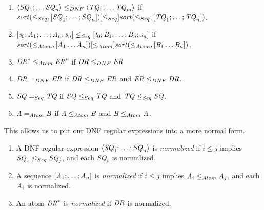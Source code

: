 \begin{definition}
  \begin{enumerate}
  \item
    $\langle\mathit{SQ}_1;\ldots\mathit{SQ}_n\rangle
    \leq_{DNF}
    \langle\mathit{TQ}_1;\ldots\mathit{TQ}_m\rangle$
    if
    $\mathit{sort}(\leq_{Seq},[ \mathit{SQ}_1;\ldots;\mathit{SQ}_n ])
    [ \leq_{Seq} ]
    \mathit{sort}(\leq_{Seq},[\mathit{TQ}_1;\ldots;\mathit{TQ}_n])$.
    
  \item
    $[\mathit{s}_0;\mathit{A}_1;\ldots;\mathit{A}_n;\mathit{s}_n]
    \leq_{Seq}
    [\mathit{t}_0;\mathit{B}_1;\ldots;\mathit{B}_n;\mathit{s}_n]$
    if
    $\mathit{sort}(\leq_{Atom},[ \mathit{A}_1\ldots\mathit{A}_n ])
    [ \leq_{Atom} ]
    \mathit{sort}(\leq_{Atom},[\mathit{B}_1\ldots\mathit{B}_n])$.

  \item
    ${\mathit{DR}}^* \leq_{Atom} {\mathit{ER}}^*$
    if
    $\mathit{DR} \leq_{DNF} \mathit{ER}$

  \item 
    $\mathit{DR} =_{DNF} \mathit{ER}$
    if
    $\mathit{DR} \leq_{DNF} \mathit{ER}$ and $\mathit{ER} \leq_{DNF} \mathit{DR}$.

  \item
    $\mathit{SQ} =_{Seq} \mathit{TQ}$
    if
    $\mathit{SQ} \leq_{Seq} \mathit{TQ}$ and $\mathit{TQ} \leq_{Seq}
    \mathit{SQ}$.

  \item
    $\mathit{A} =_{Atom} \mathit{B}$
    if
    $\mathit{A} \leq_{Atom} \mathit{B}$ and $\mathit{B} \leq_{Atom} \mathit{A}$.
  \end{enumerate}
\end{definition}

This allows us to put our DNF regular expressions into a more normal form.

\begin{definition}
  \begin{enumerate}
  \item A DNF regular expression $\langle\mathit{SQ}_1;\ldots;\mathit{SQ}_n\rangle$ is
    \textit{normalized} if $i \leq j$ implies $\mathit{SQ}_1\leq_{Seq}\mathit{SQ}_j$,
    and each $\mathit{SQ}_i$ is normalized.
  \item A sequence $[\mathit{A}_1;\ldots;\mathit{A}_n]$ is \textit{normalized}
    if $i \leq j$ implies $\mathit{A}_i\leq_{Atom}\mathit{A}_j$,
    and each $\mathit{A}_i$ is normalized.
  \item An atom ${\mathit{DR}}^*$ is \textit{normalized} if
    $\mathit{DR}$ is normalized.
  \end{enumerate}
\end{definition}

